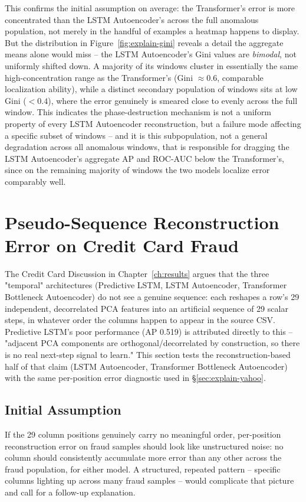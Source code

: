 This confirms the initial assumption on average: the Transformer's error is more concentrated than the LSTM Autoencoder's across the full anomalous population, not merely in the handful of examples a heatmap happens to display. But the distribution in Figure~\ref{fig:explain-gini} reveals a detail the aggregate means alone would miss -- the LSTM Autoencoder's Gini values are \emph{bimodal}, not uniformly shifted down. A majority of its windows cluster in essentially the same high-concentration range as the Transformer's (Gini $\approx 0.6$, comparable localization ability), while a distinct secondary population of windows sits at low Gini ($<0.4$), where the error genuinely is smeared close to evenly across the full window. This indicates the phase-destruction mechanism is not a uniform property of every LSTM Autoencoder reconstruction, but a failure mode affecting a specific subset of windows -- and it is this subpopulation, not a general degradation across all anomalous windows, that is responsible for dragging the LSTM Autoencoder's aggregate AP and ROC-AUC below the Transformer's, since on the remaining majority of windows the two models localize error comparably well.

\section{Pseudo-Sequence Reconstruction Error on Credit Card Fraud}
\label{sec:explain-cc}

The Credit Card Discussion in Chapter~\ref{ch:results} argues that the three "temporal" architectures (Predictive LSTM, LSTM Autoencoder, Transformer Bottleneck Autoencoder) do not see a genuine sequence: each reshapes a row's 29 independent, decorrelated PCA features into an artificial sequence of 29 scalar steps, in whatever order the columns happen to appear in the source CSV. Predictive LSTM's poor performance (AP 0.519) is attributed directly to this -- "adjacent PCA components are orthogonal/decorrelated by construction, so there is no real next-step signal to learn." This section tests the reconstruction-based half of that claim (LSTM Autoencoder, Transformer Bottleneck Autoencoder) with the same per-position error diagnostic used in \S\ref{sec:explain-yahoo}.

\subsection{Initial Assumption}

If the 29 column positions genuinely carry no meaningful order, per-position reconstruction error on fraud samples should look like unstructured noise: no column should consistently accumulate more error than any other across the fraud population, for either model. A structured, repeated pattern -- specific columns lighting up across many fraud samples -- would complicate that picture and call for a follow-up explanation.

